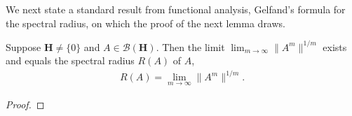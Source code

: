 We next state a standard result from functional analysis, Gelfand's formula for the spectral radius, on which the proof of the next lemma draws.

\begin{theorem}
    \label{thrm:gelfand-formula}
    \leanok
    Suppose $\mathbf{H} \ne \{0\}$ and $A \in \mathcal{B}(\mathbf{H})$. Then the limit $\lim_{m \to \infty} \|A^m\|^{1/m}$ exists and equals the spectral radius $R(A)$ of $A$,
    \begin{align}
        R(A) = \lim\limits_{m \rightarrow \infty} \|A^m\|^{1/m}.
    \end{align}
\end{theorem}
\begin{proof}
\leanok
\end{proof}

